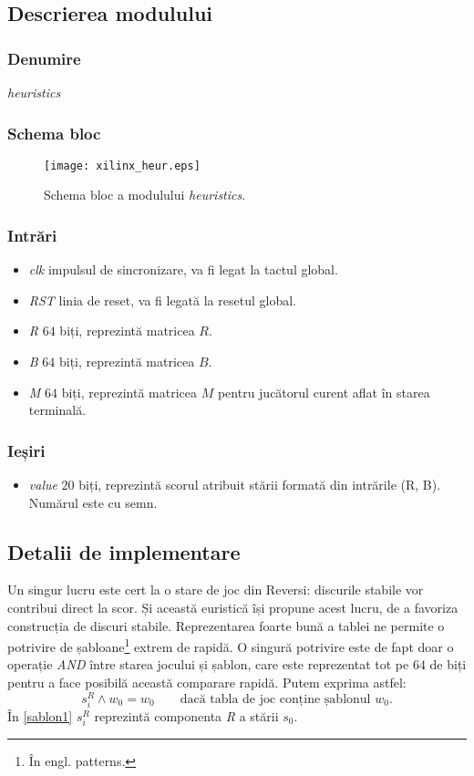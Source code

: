 \documentclass[12pt,twoside,a4paper,fleqn]{book}
\theoremstyle{definition}
\begin{document}
\subsection{Descrierea modulului}
\subsubsection{Denumire}
\emph{heuristics}

\subsubsection{Schema bloc}
\begin{figure}[h]
\texttt{[image: xilinx\_heur.eps]}
\caption{\small{Schema bloc a modulului \emph{heuristics}.}}
\label{fig:xilinx_heuristics}
\end{figure}


\subsubsection{Intrări}
\begin{itemize}
\item \emph{clk} impulsul de sincronizare, va fi legat la tactul global.
\item \emph{RST} linia de reset, va fi legată la resetul global.
\item \emph{R} $64$ biți, reprezintă matricea $R$.
\item \emph{B} $64$ biți, reprezintă matricea $B$. 
\item \emph{M} $64$ biți, reprezintă matricea $M$ pentru jucătorul curent aflat în starea terminală. 
\end{itemize}

\subsubsection{Ieșiri}
\begin{itemize}
\item \emph{value} $20$ biți, reprezintă scorul atribuit stării formată din intrările (R, B). Numărul este cu semn.
\end{itemize}

\subsection{Detalii de implementare}
Un singur lucru este cert la o stare de joc din Reversi: discurile stabile vor contribui direct la scor. Și această euristică își propune acest lucru, de a favoriza construcția de discuri stabile. Reprezentarea foarte bună a tablei ne permite o potrivire de șabloane\footnote{În engl. patterns.} extrem de rapidă. O singură potrivire este de fapt doar o operație \emph{AND} între starea jocului și șablon, care este reprezentat tot pe $64$ de biți pentru a face posibilă această comparare rapidă. Putem exprima astfel: 
\begin{equation}
\label{sablon1}
s^{R}_{i} \land w_{0} = w_{0} \qquad{} \text{dacă tabla de joc conține șablonul $w_{0}$.}
\end{equation}
În \eqref{sablon1} $s^{R}_{i}$ reprezintă componenta \emph{R} a stării $s_{0}$.
\end{document}
